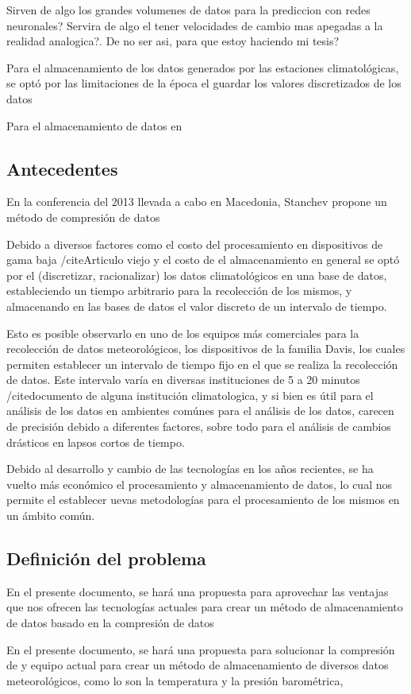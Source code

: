 Sirven de algo los grandes volumenes de datos para la prediccion con redes neuronales? Servira de algo el tener velocidades de cambio mas apegadas a la realidad analogica?. De no ser asi, para que estoy haciendo mi tesis?



Para el almacenamiento de los datos generados por las estaciones climatológicas, se optó por las limitaciones de la época el guardar los valores discretizados de los datos \cite{Marshall_1994}

Para el almacenamiento de datos en

\subsection{Antecedentes}

En la conferencia del 2013 llevada a cabo en Macedonia, Stanchev \cite{Improved_Stanchev} propone un método de compresión de datos


Debido a diversos factores como el costo del procesamiento en dispositivos de gama baja /cite{Articulo viejo} y el costo de el almacenamiento en general \cite{Marshall_1994} se optó por el (discretizar, racionalizar) los datos climatológicos en una base de datos, estableciendo un tiempo arbitrario para la recolección de los mismos, y almacenando en las bases de datos el valor discreto de un intervalo de tiempo.

Esto es posible observarlo en uno de los equipos más comerciales para la recolección de datos meteorológicos, los dispositivos de la familia Davis, los cuales permiten establecer un intervalo de tiempo fijo en el que se realiza la recolección de datos. Este intervalo varía en diversas instituciones de 5 a 20 minutos /cite{documento de alguna institución climatologica}, y si bien es útil para el análisis de los datos en ambientes comúnes para el análisis de los datos, carecen de precisión debido a diferentes factores, sobre todo para el análisis de cambios drásticos en lapsos cortos de tiempo.

Debido al desarrollo y cambio de las tecnologías en los años recientes, se ha vuelto más económico el procesamiento y almacenamiento de datos, lo cual nos permite el establecer uevas metodologías para el procesamiento de los mismos en un ámbito común.

\subsection{Definición del problema}



En el presente documento, se hará una propuesta para aprovechar las ventajas que nos ofrecen las tecnologías actuales para crear un método de almacenamiento de datos basado en la compresión de datos

En el presente documento, se hará una propuesta para solucionar la compresión de  y equipo actual para crear un método de almacenamiento de diversos datos meteorológicos, como lo son la temperatura y la presión barométrica,

